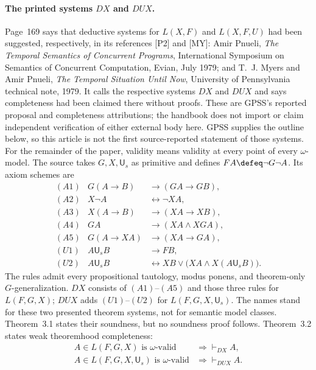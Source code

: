 








\paragraph{The printed systems \(DX\) and \(DUX\).}
Page~169 says that deductive systems for \(L(X,F)\) and \(L(X,F,U)\) had been
suggested, respectively, in its references [P2] and [MY]: Amir Pnueli,
\emph{The Temporal Semantics of Concurrent Programs}, International Symposium
on Semantics of Concurrent Computation, Evian, July 1979; and T.~J. Myers and
Amir Pnueli, \emph{The Temporal Situation Until Now}, University of
Pennsylvania technical note, 1979.  It calls the respective systems \(DX\) and
\(DUX\) and says completeness had been claimed there without proofs.  These are
GPSS's reported proposal and completeness attributions; the handbook does not
import or claim independent verification of either external body here.  GPSS
supplies the outline below, so this article is not the first source-reported
statement of those systems.
For the remainder of the paper, validity means validity at every point of every
\(\omega\)-model.  The source takes \(G,X,\mathsf U_s\) as primitive and defines
\(FA\defeq\neg G\neg A\).  Its axiom schemes are
\[
\begin{array}{rcl}
(A1)&G(A\to B)&\to(GA\to GB),\\
(A2)&X\neg A&\leftrightarrow\neg XA,\\
(A3)&X(A\to B)&\to(XA\to XB),\\
(A4)&GA&\to(XA\land XGA),\\
(A5)&G(A\to XA)&\to(XA\to GA),\\[2pt]
(U1)&A\mathbin{\mathsf U_s}B&\to FB,\\
(U2)&A\mathbin{\mathsf U_s}B
 &\leftrightarrow
 XB\lor\bigl(XA\land X(A\mathbin{\mathsf U_s}B)\bigr).
\end{array}
\]
The rules admit every propositional tautology, modus ponens, and theorem-only
\(G\)-generalization.  \(DX\) consists of \((A1)\)--\((A5)\) and those three
rules for \(L(F,G,X)\); \(DUX\) adds \((U1)\)--\((U2)\) for
\(L(F,G,X,\mathsf U_s)\).  The names stand for these two presented theorem systems,
not for semantic model classes.  Theorem~3.1 states their soundness, but no
soundness proof follows.  Theorem~3.2 states weak theoremhood completeness:
\[
\begin{aligned}
 A\in L(F,G,X)\text{ is \(\omega\)-valid}
   &\Longrightarrow \vdash_{DX}A,\\
 A\in L(F,G,X,\mathsf U_s)\text{ is \(\omega\)-valid}
   &\Longrightarrow \vdash_{DUX}A.
\end{aligned}
\]

